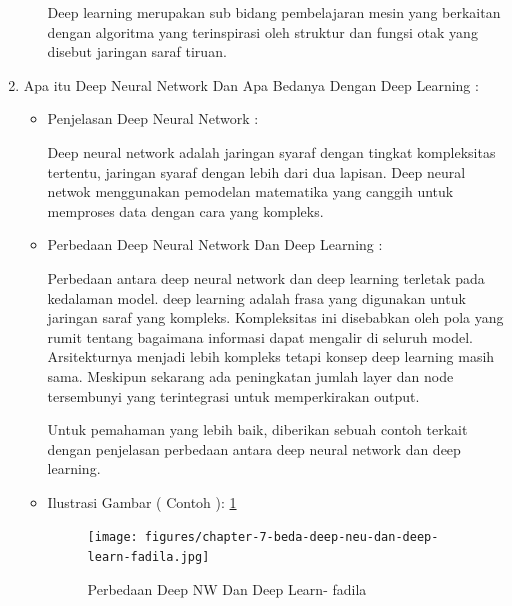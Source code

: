 \begin{enumerate}
\begin{itemize}
\par Deep learning merupakan sub bidang pembelajaran mesin yang berkaitan dengan algoritma yang terinspirasi oleh struktur dan fungsi otak yang disebut jaringan saraf tiruan.
\par
\par
\par
\end{itemize}
\item Apa itu Deep Neural Network Dan Apa Bedanya Dengan Deep Learning :
\begin{itemize}
\item Penjelasan Deep Neural Network : 
\par Deep neural network adalah jaringan syaraf dengan tingkat kompleksitas tertentu, jaringan syaraf dengan lebih dari dua lapisan. Deep neural netwok menggunakan pemodelan matematika yang canggih untuk memproses data dengan cara yang kompleks.
\par
\item Perbedaan Deep Neural Network Dan Deep Learning :
\par Perbedaan antara deep neural network dan deep learning terletak pada kedalaman model. deep learning adalah frasa yang digunakan untuk jaringan saraf yang kompleks. Kompleksitas ini disebabkan oleh pola yang rumit tentang bagaimana informasi dapat mengalir di seluruh model. Arsitekturnya menjadi lebih kompleks tetapi konsep deep learning masih sama. Meskipun sekarang ada peningkatan jumlah layer dan node tersembunyi yang terintegrasi untuk memperkirakan output.
\par Untuk pemahaman yang lebih baik, diberikan sebuah contoh terkait dengan penjelasan perbedaan antara deep neural network dan deep learning.
\par
\par
\item Ilustrasi Gambar ( Contoh ): \ref{chapter-7-beda-deep-neu-dan-deep-learn-fadila}
\par
\par
\begin{figure}[!hbtp]
\centering
\texttt{[image: figures/chapter-7-beda-deep-neu-dan-deep-learn-fadila.jpg]}
\caption{Perbedaan Deep NW Dan Deep Learn- fadila}
\label{chapter-7-beda-deep-neu-dan-deep-learn-fadila}
\end{figure}
\par
\par
\end{itemize}
\par
\par

\end{enumerate}
